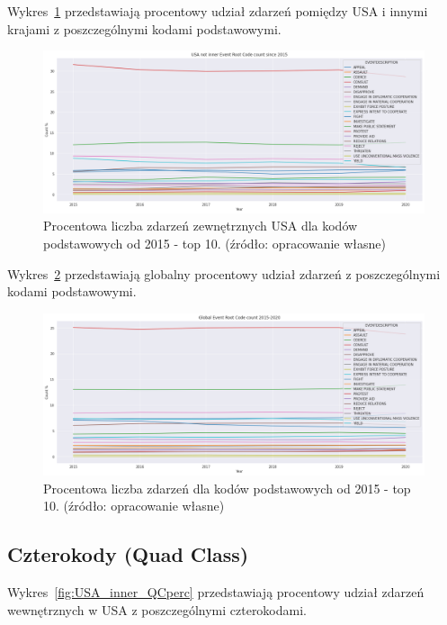 \documentclass[11pt]{report}
\begin{document}
    Wykres~\ref{fig:USA_not_inner_ERCperc} przedstawiają procentowy udział zdarzeń pomiędzy USA i innymi krajami z poszczególnymi kodami podstawowymi.
    \begin{figure}[!htp]
        \centering
        \includegraphics[width=\linewidth]{fig/USA not inner/ERCperc.png}
        \caption{Procentowa liczba zdarzeń zewnętrznych USA dla kodów podstawowych od 2015 - top 10. (źródło: opracowanie własne)}
        \label{fig:USA_not_inner_ERCperc}
    \end{figure}

    Wykres~\ref{fig:GLOBAL_ERCperc} przedstawiają globalny procentowy udział zdarzeń z poszczególnymi kodami podstawowymi.

    \begin{figure}[!htp]
        \centering
        \includegraphics[width=\linewidth]{fig/GLOBAL/ERCperc.png}
        \caption{Procentowa liczba zdarzeń dla kodów podstawowych od 2015 - top 10. (źródło: opracowanie własne)}
        \label{fig:GLOBAL_ERCperc}
    \end{figure}

    \subsection{Czterokody (Quad Class)}\label{subsec:czterokodynullquad-classnull2}

    Wykres~\ref{fig:USA_inner_QCperc} przedstawiają procentowy udział zdarzeń wewnętrznych w USA z poszczególnymi czterokodami.
\end{document}

